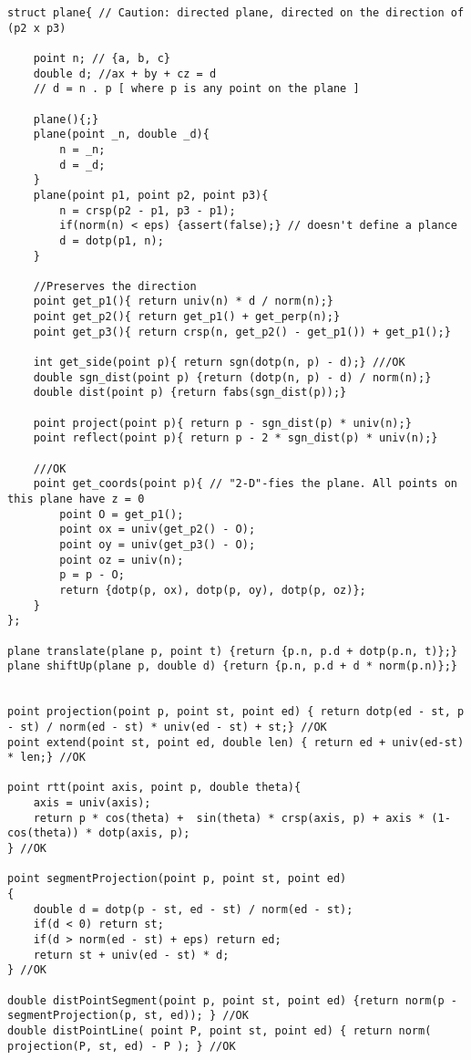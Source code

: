 \documentclass[10pt,a4paper,onesided]{article}
\begin{document}
\begin{multicols*}{3}
\begin{lstlisting}
struct plane{ // Caution: directed plane, directed on the direction of (p2 x p3)

	point n; // {a, b, c}
	double d; //ax + by + cz = d
	// d = n . p [ where p is any point on the plane ]

	plane(){;}
	plane(point _n, double _d){
        n = _n;
        d = _d;
	}
	plane(point p1, point p2, point p3){
		n = crsp(p2 - p1, p3 - p1);
		if(norm(n) < eps) {assert(false);} // doesn't define a plance
		d = dotp(p1, n);
	}

    //Preserves the direction
	point get_p1(){ return univ(n) * d / norm(n);}
	point get_p2(){ return get_p1() + get_perp(n);}
	point get_p3(){ return crsp(n, get_p2() - get_p1()) + get_p1();}

	int get_side(point p){ return sgn(dotp(n, p) - d);} ///OK
	double sgn_dist(point p) {return (dotp(n, p) - d) / norm(n);}
	double dist(point p) {return fabs(sgn_dist(p));}

	point project(point p){ return p - sgn_dist(p) * univ(n);}
	point reflect(point p){ return p - 2 * sgn_dist(p) * univ(n);}

    ///OK
    point get_coords(point p){ // "2-D"-fies the plane. All points on this plane have z = 0
        point O = get_p1();
        point ox = univ(get_p2() - O);
        point oy = univ(get_p3() - O);
        point oz = univ(n);
        p = p - O;
        return {dotp(p, ox), dotp(p, oy), dotp(p, oz)};
    }
};

plane translate(plane p, point t) {return {p.n, p.d + dotp(p.n, t)};}
plane shiftUp(plane p, double d) {return {p.n, p.d + d * norm(p.n)};}


point projection(point p, point st, point ed) { return dotp(ed - st, p - st) / norm(ed - st) * univ(ed - st) + st;} //OK
point extend(point st, point ed, double len) { return ed + univ(ed-st) * len;} //OK

point rtt(point axis, point p, double theta){
    axis = univ(axis);
    return p * cos(theta) +  sin(theta) * crsp(axis, p) + axis * (1-cos(theta)) * dotp(axis, p);
} //OK

point segmentProjection(point p, point st, point ed)
{
    double d = dotp(p - st, ed - st) / norm(ed - st);
    if(d < 0) return st;
    if(d > norm(ed - st) + eps) return ed;
    return st + univ(ed - st) * d;
} //OK

double distPointSegment(point p, point st, point ed) {return norm(p - segmentProjection(p, st, ed)); } //OK
double distPointLine( point P, point st, point ed) { return norm( projection(P, st, ed) - P ); } //OK


\end{lstlisting}
\end{multicols*}
\end{document}

